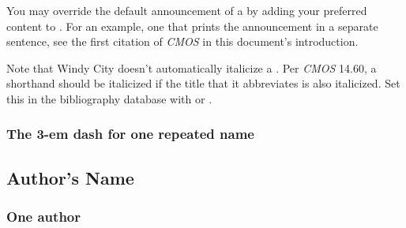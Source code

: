 \documentclass[11pt,letterpaper,oneside]{article}
\begin{document}
You may override the default announcement of a  by
adding your preferred content to . For an
example, one that prints the announcement in a separate sentence, see
the first citation of \textit{CMOS} in this document's introduction.

Note that Windy City doesn't automatically italicize a
. Per \textit{CMOS} 14.60, a shorthand should be
italicized if the title that it abbreviates is also italicized. Set
this in the bibliography database with  or .

\begin{citebib}
\item \cite[1:126]{shurtleff1853}
\item \cite[2:330]{shurtleff1853}
\end{citebib}

\setcounter{subsubsection}{67}
\subsubsection{The 3-em dash for one repeated name}

\begin{bibonly}
\nocite{judt1996,judt2008,judt1989,squire1983,squire1987}
\end{bibonly}

\setcounter{subsection}{2}
\subsection{Author's Name}
\setcounter{subsection}{14}

\setcounter{subsubsection}{74}
\subsubsection{One author}

\begin{citebib}
\item \cite[33]{shields2013}
\item \cite[677]{chun2015}
\item \cite[5]{mccune2014}
\item \cite[100--101]{shields2013}
\item \cite[681]{chun2015}
\item \cite[105--11]{mccune2014}
\end{citebib}
\end{document}
